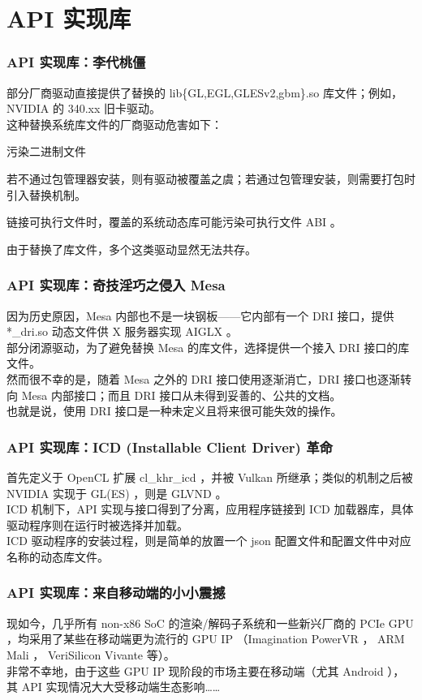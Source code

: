 \documentclass{ctexbeamer}
\begin{document}
\section{API 实现库}

\begin{frame}
    \frametitle{API 实现库：李代桃僵}
    部分厂商驱动直接提供了替换的 lib\{GL,EGL,GLESv2,gbm\}.so 库文件；例如， NVIDIA 的 340.xx 旧卡驱动。\\
    这种替换系统库文件的厂商驱动危害如下：\\
    \begin{labeling}{污染二进制文件}
        \item [污染包管理器] 若不通过包管理器安装，则有驱动被覆盖之虞；若通过包管理安装，则需要打包时引入替换机制。
        \item [污染二进制文件] 链接可执行文件时，覆盖的系统动态库可能污染可执行文件 ABI 。
        \item [无法共存] 由于替换了库文件，多个这类驱动显然无法共存。
    \end{labeling}
\end{frame}

\begin{frame}
    \frametitle{API 实现库：奇技淫巧之侵入 Mesa}
    因为历史原因，Mesa 内部也不是一块钢板——它内部有一个 DRI 接口，提供 *\_dri.so 动态文件供 X 服务器实现 AIGLX 。\\
    部分闭源驱动，为了避免替换 Mesa 的库文件，选择提供一个接入 DRI 接口的库文件。\\
    然而很不幸的是，随着 Mesa 之外的 DRI 接口使用逐渐消亡，DRI 接口也逐渐转向 Mesa 内部接口；而且 DRI 接口从未得到妥善的、公共的文档。\\
    也就是说，使用 DRI 接口是一种未定义且将来很可能失效的操作。
\end{frame}

\begin{frame}
    \frametitle{API 实现库：ICD (Installable Client Driver) 革命}
    首先定义于 OpenCL 扩展 cl\_khr\_icd ，并被 Vulkan 所继承；类似的机制之后被 NVIDIA 实现于 GL(ES) ，则是 GLVND 。\\
    ICD 机制下，API 实现与接口得到了分离，应用程序链接到 ICD 加载器库，具体驱动程序则在运行时被选择并加载。\\
    ICD 驱动程序的安装过程，则是简单的放置一个 json 配置文件和配置文件中对应名称的动态库文件。
\end{frame}

\begin{frame}
    \frametitle{API 实现库：来自移动端的小小震撼}
    现如今，几乎所有 non-x86 SoC 的渲染/解码子系统和一些新兴厂商的 PCIe GPU ，均采用了某些在移动端更为流行的 GPU IP （Imagination PowerVR ， ARM Mali ， VeriSilicon Vivante 等）。\\
    非常不幸地，由于这些 GPU IP 现阶段的市场主要在移动端（尤其 Android ），其 API 实现情况大大受移动端生态影响……
\end{frame}
\end{document}
